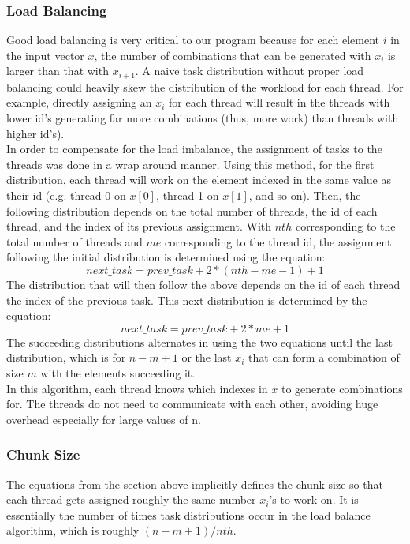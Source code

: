 \subsubsection{Load Balancing}
Good load balancing is very critical to our program because for each element $i$ in the input vector $x$, the number of combinations that can be generated with $x_{i}$ is larger than that with $x_{i+1}$. A naive task distribution without proper load balancing could heavily skew the distribution of the workload for each thread. For example, directly assigning an $x_{i}$ for each thread will result in the threads with lower id's generating far more combinations (thus, more work) than threads with higher id's).\\
\null
In order to compensate for the load imbalance, the assignment of tasks to the threads was done in a wrap around manner. Using this method, for the first distribution, each thread will work on the element indexed in the same value as their id (e.g. thread 0 on $x[0]$, thread 1 on $x[1]$, and so on). Then, the following distribution depends on the total number of threads, the id of each thread, and the index of its previous assignment. With $nth$ corresponding to the total number of threads and $me$ corresponding to the thread id, the assignment following the initial distribution is determined using the equation:
\begin{equation}
next\_task = prev\_task + 2 * (nth - me - 1) + 1
\end{equation}
The distribution that will then follow the above depends on the id of each thread the index of the previous task. This next distribution is determined by the equation:
\begin{equation}
next\_task = prev\_task + 2 * me + 1
\end{equation}
The succeeding distributions alternates in using the two equations until the last distribution, which is for $n - m + 1$ or the last $x_{i}$ that can form a combination of size $m$ with the elements succeeding it.\\
\null
In this algorithm, each thread knows which indexes in $x$ to generate combinations for. The threads do not need to communicate with each other, avoiding huge overhead especially for large values of n.

\subsubsection{Chunk Size}
The equations from the section above implicitly defines the chunk size so that each thread gets assigned roughly the same number $x_{i}$'s to work on. It is essentially the number of times task distributions occur in the load balance algorithm, which is roughly $(n-m+1)/nth$.

